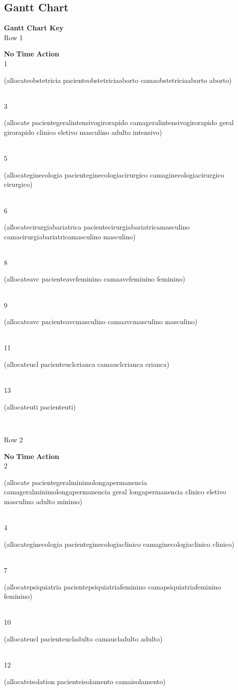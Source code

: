 \documentclass[a4paper,12pt]{article}
\newcommand{\action}[1]{{\sf #1}}
\newcommand{\listrowg}[1]{\begin{minipage}[t]{10cm} #1 \end{minipage}}
\begin{document}
\subsection{Gantt Chart}
{\bf Gantt Chart Key}\\
Row 1
\begin{tabbing}
{\bf No} \qquad \= {\bf Time} \qquad \= {\bf Action} \\
1  \> \listrowg{\action{(allocateobstetricia pacienteobstetriciaaborto camaobstetriciaaborto aborto)}} \\
3  \> \listrowg{\action{(allocate pacientegeralintensivogirorapido camageralintensivogirorapido geral girorapido clinico eletivo masculino adulto intensivo)}} \\
5  \> \listrowg{\action{(allocateginecologia pacienteginecologiacirurgico camaginecologiacirurgico cirurgico)}} \\
6  \> \listrowg{\action{(allocatecirurgiabariatrica pacientecirurgiabariatricamasculino camacirurgiabariatricamasculino masculino)}} \\
8  \> \listrowg{\action{(allocateavc pacienteavcfeminino camaavcfeminino feminino)}} \\
9  \> \listrowg{\action{(allocateavc pacienteavcmasculino camaavcmasculino masculino)}} \\
11  \> \listrowg{\action{(allocateucl pacienteuclcrianca camauclcrianca crianca)}} \\
13  \> \listrowg{\action{(allocateuti pacienteuti)}} \\
\end{tabbing}
Row 2
\begin{tabbing}
{\bf No} \qquad \= {\bf Time} \qquad \= {\bf Action} \\
2  \> \listrowg{\action{(allocate pacientegeralminimolongapermanencia camageralminimolongapermanencia geral longapermanencia clinico eletivo masculino adulto minimo)}} \\
4  \> \listrowg{\action{(allocateginecologia pacienteginecologiaclinico camaginecologiaclinico clinico)}} \\
7  \> \listrowg{\action{(allocatepsiquiatria pacientepsiquiatriafeminino camapsiquiatriafeminino feminino)}} \\
10  \> \listrowg{\action{(allocateucl pacienteucladulto camaucladulto adulto)}} \\
12  \> \listrowg{\action{(allocateisolation pacienteisolamento camaisolamento)}} \\
\end{tabbing}
\end{document}
